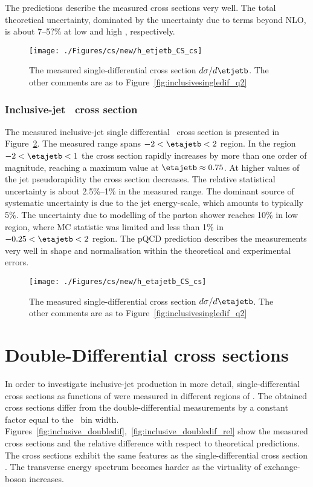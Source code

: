 The predictions describe the measured cross sections very well. The total theoretical uncertainty, dominated by the uncertainty due to terms beyond NLO, is about 7--5?\% at low and high \etjetb, respectively. 
\begin{figure}[p]
	\centering
		\texttt{[image: ./Figures/cs/new/h\_etjetb\_CS\_cs]}
	\caption{The measured single-differential cross section $d\sigma/d\etjetb$. The other comments are as to Figure~\ref{fig:inclusivesingledif_q2}}
	\label{fig:inclusivesingledif_et}
\end{figure}

\subsubsection*{Inclusive-jet \dsdetajetb~cross section}
The measured inclusive-jet single differential \dsdetajetb~cross section is presented in Figure~\ref{fig:inclusivesingledif_eta}. The measured range spans $-2 < \etajetb < 2$ region. In the region  $-2 < \etajetb < 1$ the cross section rapidly increases by more than one order of magnitude, reaching a maximum value at $\etajetb \approx 0.75$. At higher values of the jet pseudorapidity the cross section decreases. The relative statistical uncertainty is about 2.5\%--1\% in the measured range. The dominant source of systematic uncertainty is due to the jet energy-scale, which amounts to typically 5\%. The uncertainty due to modelling of the parton shower reaches 10\% in low \etajetb region, where MC statistic was limited and less than 1\% in $-0.25 < \etajetb < 2$ region. The pQCD prediction describes the measurements very well in shape and normalisation within the theoretical and experimental errors.
\begin{figure}[p]
	\centering
		\texttt{[image: ./Figures/cs/new/h\_etajetb\_CS\_cs]}
	\caption{The measured single-differential cross section $d\sigma/d\etajetb$. The other comments are as to Figure~\ref{fig:inclusivesingledif_q2}}
	\label{fig:inclusivesingledif_eta}
\end{figure}

\section{Double-Differential cross sections}
In order to investigate inclusive-jet production in more detail, single-differential cross sections as functions of \etjetb were measured in different regions of \qsq. The obtained cross sections differ from the double-differential measurements by a constant factor equal to the \qsq~bin width. Figures~\ref{fig:inclusive_doubledif},~\ref{fig:inclusive_doubledif_rel} show the measured cross sections and the relative difference with respect to theoretical predictions. The cross sections exhibit the same features as the single-differential cross section \dsdetjetb. The transverse energy spectrum becomes harder as the virtuality of exchange-boson increases.

